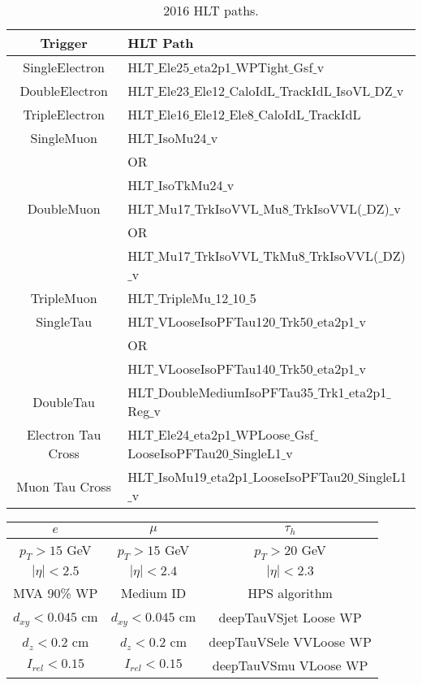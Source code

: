\begin{table}[h]
    \centering
    \begin{tabular}{|c|l|}
    \hline
    Trigger & HLT Path  \\
    \hline
    SingleElectron & HLT$\_$Ele25$\_$eta2p1$\_$WPTight$\_$Gsf$\_$v\\
    \hline
    DoubleElectron & HLT$\_$Ele23$\_$Ele12$\_$CaloIdL$\_$TrackIdL$\_$IsoVL$\_$DZ$\_$v \\
    \hline
    TripleElectron & HLT$\_$Ele16$\_$Ele12$\_$Ele8$\_$CaloIdL$\_$TrackIdL \\
    \hline
    SingleMuon & HLT$\_$IsoMu24$\_$v \\
    & OR \\
    & HLT$\_$IsoTkMu24$\_$v \\
    \hline
    DoubleMuon & HLT$\_$Mu17$\_$TrkIsoVVL$\_$Mu8$\_$TrkIsoVVL($\_$DZ)$\_$v \\
    & OR \\
    & HLT$\_$Mu17$\_$TrkIsoVVL$\_$TkMu8$\_$TrkIsoVVL($\_$DZ)$\_$v \\
    \hline
    TripleMuon & HLT$\_$TripleMu$\_$12$\_$10$\_$5 \\
    \hline
    SingleTau & HLT$\_$VLooseIsoPFTau120$\_$Trk50$\_$eta2p1$\_$v \\
    & OR \\
    & HLT$\_$VLooseIsoPFTau140$\_$Trk50$\_$eta2p1$\_$v \\
    \hline
    DoubleTau & HLT$\_$DoubleMediumIsoPFTau35$\_$Trk1$\_$eta2p1$\_$Reg$\_$v \\
    \hline
    Electron Tau Cross & HLT$\_$Ele24$\_$eta2p1$\_$WPLoose$\_$Gsf$\_$LooseIsoPFTau20$\_$SingleL1$\_$v \\
    \hline
    Muon Tau Cross & HLT$\_$IsoMu19$\_$eta2p1$\_$LooseIsoPFTau20$\_$SingleL1$\_$v \\
    \hline
    \end{tabular}
    \caption{2016 HLT paths.}
\end{table}

\begin{table}[]
\begin{tabular}{|c|c|c|}
\hline
$e$ & $\mu$ &  $\tau_{h}$ \\
\hline
\hline
$p_{T} > 15$ GeV & $p_{T} > 15$ GeV & $p_{T} > 20$ GeV \\
$|\eta| < 2.5$ & $|\eta| < 2.4$ & $|\eta| < 2.3$ \\
MVA 90\% WP & Medium ID & HPS algorithm \\
$d_{xy} < 0.045$ cm & $d_{xy} < 0.045$ cm & deepTauVSjet Loose WP \\
$d_{z} < 0.2$ cm & $d_{z} < 0.2$ cm & deepTauVSele VVLoose WP \\
$I_{rel} < 0.15$ & $I_{rel} < 0.15$ & deepTauVSmu VLoose WP \\
\hline
\end{tabular}
\end{table}

